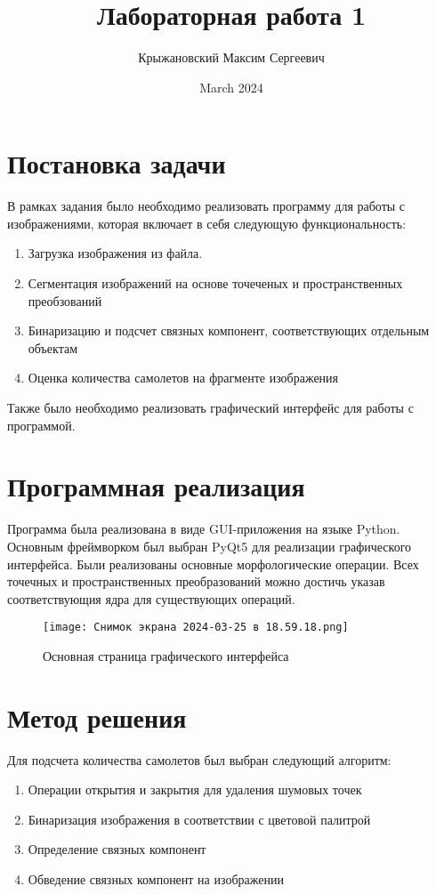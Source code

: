 \documentclass{article}
\title{Лабораторная работа 1}
\author{Крыжановский Максим Сергеевич}
\date{March 2024}
\begin{document}
\maketitle

\section{Постановка задачи}

В рамках задания было необходимо реализовать программу для работы с изображениями, которая включает в себя следующую функциональность:

\begin{enumerate}
    \item Загрузка изображения из файла.
    \item Сегментация изображений на основе точеченых и пространственных преобзований
    \item Бинаризацию и подсчет связных компонент, соответствующих отдельным объектам
    \item Оценка количества самолетов на фрагменте изображения
\end{enumerate}

Также было необходимо реализовать графический интерфейс для работы с программой.

\section{Программная реализация}

Программа была реализована в виде GUI-приложения на языке Python. Основным фреймворком был выбран PyQt5 для реализации графического интерфейса. Были реализованы основные морфологические операции. Всех точечных и пространственных преобразований можно достичь указав соответствующия ядра для существующих операций.

\begin{figure}[h!]
    \centering
    \texttt{[image: Снимок экрана 2024-03-25 в 18.59.18.png]}
    \caption{Основная страница графического интерфейса}
    \label{fig:enter-label}
\end{figure}

\section{Метод решения}

Для подсчета количества самолетов был выбран следующий алгоритм:

\begin{enumerate}
    \item Операции открытия и закрытия для удаления шумовых точек
    \item Бинаризация изображения в соответствии с цветовой палитрой
    \item Определение связных компонент
    \item Обведение связных компонент на изображении
\end{enumerate}
\end{document}
